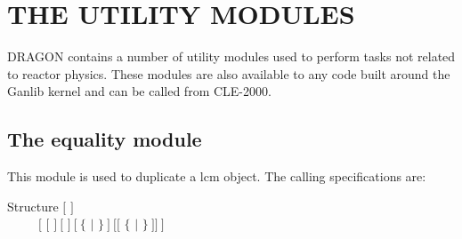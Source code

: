 \section{THE UTILITY MODULES}\label{sect:UtilityModuleInput}

DRAGON contains a number of utility modules used to perform tasks not
related to reactor physics. These modules are also available to any code built
around the Ganlib kernel and can be called from CLE-2000.\cite{ganlib5,cle2000}

\subsection{The equality module}\label{sect:EQUData}

This module is used to duplicate a {\sc lcm} object. The calling specifications
are:

\begin{DataStructure}{Structure }
 \moc{:=} $[$  $]$  \\
~~~~~$[$ \moc{::} $[$   $]~[$  $]~[~\{$  $|$ $\}~]~[[$  $\{$   $|$   $\}~]]~]$ \moc{;} \\
\end{DataStructure}

